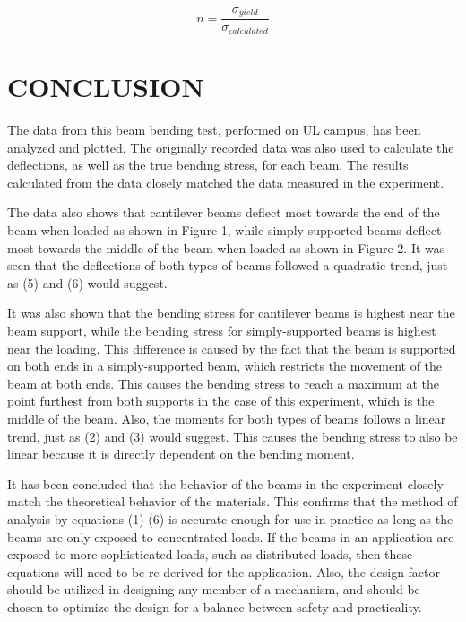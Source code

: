 \documentclass[12pt]{article}
\begin{document}
\begin{equation}
n=\frac{\sigma_{yield}}{\sigma_{calculated}}
\end{equation}
\bigskip

\section*{\fontsize{12}{12}\selectfont CONCLUSION}
The data from this beam bending test, performed on UL campus, has been analyzed and plotted. The originally recorded data was also used to calculate the deflections, as well as the true bending stress, for each beam. The results calculated from the data closely matched the data measured in the experiment. 
\bigskip

The data also shows that cantilever beams deflect most towards the end of the beam when loaded as shown in Figure 1, while simply-supported beams deflect most towards the middle of the beam when loaded as shown in Figure 2. It was seen that the deflections of both types of beams followed a quadratic trend, just as (5) and (6) would suggest.
\bigskip

It was also shown that the bending stress for cantilever beams is highest near the beam support, while the bending stress for simply-supported beams is highest near the loading. This difference is caused by the fact that the beam is supported on both ends in a simply-supported beam, which restricts the movement of the beam at both ends. This causes the bending stress to reach a maximum at the point furthest from both supports in the case of this experiment, which is the middle of the beam. Also, the moments for both types of beams follows a linear trend, just as (2) and (3) would suggest. This causes the bending stress to also be linear because it is directly dependent on the bending moment.
\bigskip

It has been concluded that the behavior of the beams in the experiment closely match the theoretical behavior of the materials. This confirms that the method of analysis by equations (1)-(6) is accurate enough for use in practice as long as the beams are only exposed to concentrated loads. If the beams in an application are exposed to more sophisticated loads, such as distributed loads, then these equations will need to be re-derived for the application. Also, the design factor should be utilized in designing any member of a mechanism, and should be chosen to optimize the design for a balance between safety and practicality.
\bigskip
\end{document}
